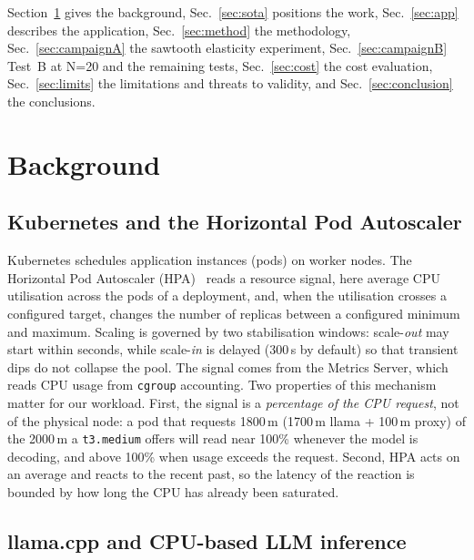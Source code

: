 \documentclass[conference]{IEEEtran}
\newcommand{\code}[1]{\texttt{#1}}
\begin{document}
Section~\ref{sec:background} gives the background, Sec.~\ref{sec:sota}
positions the work, Sec.~\ref{sec:app} describes the application,
Sec.~\ref{sec:method} the methodology, Sec.~\ref{sec:campaignA} the sawtooth
elasticity experiment, Sec.~\ref{sec:campaignB} Test~B at N=20 and the
remaining tests, Sec.~\ref{sec:cost} the cost evaluation,
Sec.~\ref{sec:limits} the limitations and threats to validity, and
Sec.~\ref{sec:conclusion} the conclusions.

\section{Background}
\label{sec:background}

\subsection{Kubernetes and the Horizontal Pod Autoscaler}

Kubernetes schedules application instances (pods) on worker nodes. The
Horizontal Pod Autoscaler (HPA)~\cite{k8s} reads a resource signal, here average CPU
utilisation across the pods of a deployment, and, when the utilisation
crosses a configured target, changes the number of replicas between a
configured minimum and maximum. Scaling is governed by two stabilisation
windows: scale-\emph{out} may start within seconds, while scale-\emph{in} is
delayed (300\,s by default) so that transient dips do not collapse the pool.
The signal comes from the Metrics Server, which reads CPU usage from
\code{cgroup} accounting. Two properties of this mechanism matter for our
workload. First, the signal is a \emph{percentage of the CPU request}, not of the
physical node: a pod that requests 1800\,m (1700\,m llama + 100\,m proxy) of
the 2000\,m a \code{t3.medium} offers will read near 100\% whenever the model
is decoding, and above 100\% when usage exceeds the request. Second, HPA acts
on an average and reacts to the recent past, so the latency of the reaction is
bounded by how long the CPU has already been saturated.

\subsection{llama.cpp and CPU-based LLM inference}
\end{document}
